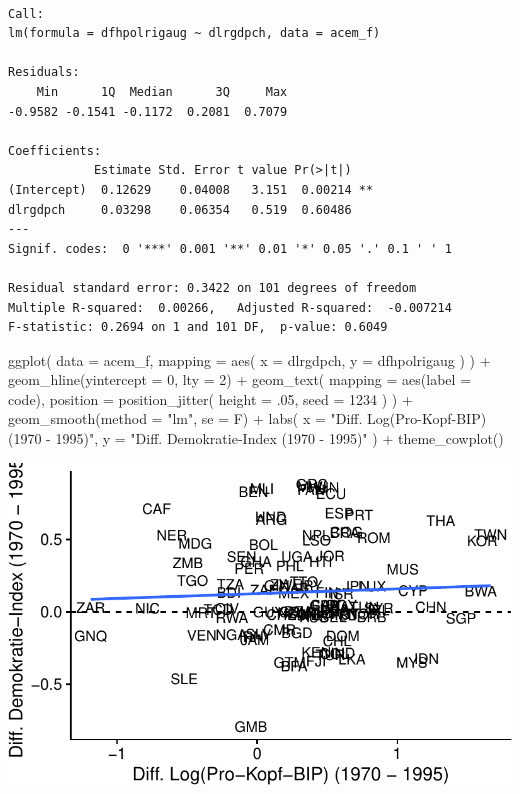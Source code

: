 \documentclass[
  a4paper,
  DIV=11,
  oneside]{scrreprt}
\newenvironment{Shaded}{\begin{snugshade}}{\end{snugshade}}
\newcommand{\AttributeTok}[1]{\textcolor[rgb]{0.40,0.45,0.13}{#1}}
\newcommand{\DecValTok}[1]{\textcolor[rgb]{0.68,0.00,0.00}{#1}}
\newcommand{\FunctionTok}[1]{\textcolor[rgb]{0.28,0.35,0.67}{#1}}
\newcommand{\NormalTok}[1]{\textcolor[rgb]{0.00,0.23,0.31}{#1}}
\newcommand{\SpecialCharTok}[1]{\textcolor[rgb]{0.37,0.37,0.37}{#1}}
\newcommand{\StringTok}[1]{\textcolor[rgb]{0.13,0.47,0.30}{#1}}
\begin{document}
\begin{verbatim}

Call:
lm(formula = dfhpolrigaug ~ dlrgdpch, data = acem_f)

Residuals:
    Min      1Q  Median      3Q     Max 
-0.9582 -0.1541 -0.1172  0.2081  0.7079 

Coefficients:
            Estimate Std. Error t value Pr(>|t|)   
(Intercept)  0.12629    0.04008   3.151  0.00214 **
dlrgdpch     0.03298    0.06354   0.519  0.60486   
---
Signif. codes:  0 '***' 0.001 '**' 0.01 '*' 0.05 '.' 0.1 ' ' 1

Residual standard error: 0.3422 on 101 degrees of freedom
Multiple R-squared:  0.00266,   Adjusted R-squared:  -0.007214 
F-statistic: 0.2694 on 1 and 101 DF,  p-value: 0.6049
\end{verbatim}

\begin{Shaded}
\begin{Highlighting}[]
\FunctionTok{ggplot}\NormalTok{(}
  \AttributeTok{data =}\NormalTok{ acem\_f,}
  \AttributeTok{mapping =} \FunctionTok{aes}\NormalTok{(}
    \AttributeTok{x =}\NormalTok{ dlrgdpch,}
    \AttributeTok{y =}\NormalTok{ dfhpolrigaug}
\NormalTok{  ) }
\NormalTok{  ) }\SpecialCharTok{+}
  \FunctionTok{geom\_hline}\NormalTok{(}\AttributeTok{yintercept =} \DecValTok{0}\NormalTok{, }\AttributeTok{lty =} \DecValTok{2}\NormalTok{) }\SpecialCharTok{+}
  \FunctionTok{geom\_text}\NormalTok{(}
    \AttributeTok{mapping =} \FunctionTok{aes}\NormalTok{(}\AttributeTok{label =}\NormalTok{ code),}
    \AttributeTok{position =} \FunctionTok{position\_jitter}\NormalTok{(}
      \AttributeTok{height =}\NormalTok{ .}\DecValTok{05}\NormalTok{, }
      \AttributeTok{seed =} \DecValTok{1234}
\NormalTok{      )}
\NormalTok{    ) }\SpecialCharTok{+}
  \FunctionTok{geom\_smooth}\NormalTok{(}\AttributeTok{method =} \StringTok{"lm"}\NormalTok{, }\AttributeTok{se =}\NormalTok{ F) }\SpecialCharTok{+}
  \FunctionTok{labs}\NormalTok{(}
    \AttributeTok{x =} \StringTok{"Diff. Log(Pro{-}Kopf{-}BIP) (1970 {-} 1995)"}\NormalTok{,}
    \AttributeTok{y =} \StringTok{"Diff. Demokratie{-}Index (1970 {-} 1995)"}
\NormalTok{  ) }\SpecialCharTok{+}
  \FunctionTok{theme\_cowplot}\NormalTok{()}
\end{Highlighting}
\end{Shaded}

\includegraphics{FixedEffects_files/figure-pdf/unnamed-chunk-33-1.pdf}
\end{document}
